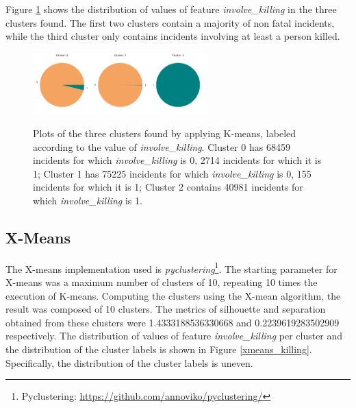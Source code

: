 \documentclass[10pt,a4paper]{report}
\begin{document}
Figure \ref{kmeans_killing} shows the distribution of values of feature \textit{involve\_killing} in the three clusters found.
The first two clusters contain a majority of non fatal incidents, while the third cluster only contains incidents involving at least a person killed.
\begin{figure}[h]
	\centering
	\includegraphics[width=0.2\textwidth]{kmeans_0}\includegraphics[width=0.2\textwidth]{kmeans_1}\includegraphics[width=0.2\textwidth]{kmeans_2}
	\caption{Plots of the three clusters found by applying K-means, labeled according to the value of \textit{involve\_killing}.
	Cluster 0 has 68459 incidents for which \textit{involve\_killing} is 0, 2714 incidents for which it is 1;
	Cluster 1 has 75225 incidents for which \textit{involve\_killing} is 0, 155 incidents for which it is 1;
	Cluster 2 contains 40981 incidents for which \textit{involve\_killing} is 1.}
	\label{kmeans_killing}
\end{figure}

\subsection{X-Means}

The X-means implementation used is \textit{pyclustering}\footnote{Pyclustering: \url{https://github.com/annoviko/pyclustering/}}.
The starting parameter for X-means was a maximum number of clusters of 10, repeating 10 times the execution of K-means.
Computing the clusters using the X-mean algorithm, the result was composed of 10 clusters.
The metrics of silhouette and separation obtained from these clusters were 1.4333188536330668 and 0.2239619283502909 respectively.
The distribution of values of feature \textit{involve\_killing} per cluster and the distribution of the cluster labels is shown in Figure \ref{xmeans_killing}.
Specifically, the distribution of the cluster labels is uneven.
\end{document}
